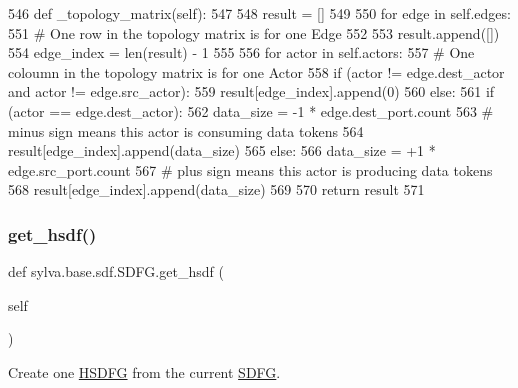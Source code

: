 \begin{DoxyCode}
546     \textcolor{keyword}{def }\_topology\_matrix(self):
547 
548         result = []
549 
550         \textcolor{keywordflow}{for} edge \textcolor{keywordflow}{in} self.edges:
551             \textcolor{comment}{# One row in the topology matrix is for one Edge}
552 
553             result.append([])
554             edge\_index = len(result) - 1
555 
556             \textcolor{keywordflow}{for} actor \textcolor{keywordflow}{in} self.actors:
557                 \textcolor{comment}{# One coloumn in the topology matrix is for one Actor}
558                 \textcolor{keywordflow}{if} (actor != edge.dest\_actor \textcolor{keywordflow}{and} actor != edge.src\_actor):
559                     result[edge\_index].append(0)
560                 \textcolor{keywordflow}{else}:
561                     \textcolor{keywordflow}{if} (actor == edge.dest\_actor):
562                         data\_size = -1 * edge.dest\_port.count
563                         \textcolor{comment}{# minus sign means this actor is consuming data tokens}
564                         result[edge\_index].append(data\_size)
565                     \textcolor{keywordflow}{else}:
566                         data\_size = +1 * edge.src\_port.count
567                         \textcolor{comment}{# plus sign means this actor is producing data tokens}
568                         result[edge\_index].append(data\_size)
569 
570         \textcolor{keywordflow}{return} result
571 
\end{DoxyCode}
\mbox{\label{classsylva_1_1base_1_1sdf_1_1_s_d_f_g_a66a5aaee4dc1232667e724e318f17008}} 
\subsubsection{\texorpdfstring{get\+\_\+hsdf()}{get\_hsdf()}}
{\footnotesize\ttfamily def sylva.\+base.\+sdf.\+S\+D\+F\+G.\+get\+\_\+hsdf (\begin{DoxyParamCaption}\item[{}]{self }\end{DoxyParamCaption})}



Create one \hyperlink{classsylva_1_1base_1_1sdf_1_1_h_s_d_f_g}{H\+S\+D\+FG} from the current \hyperlink{classsylva_1_1base_1_1sdf_1_1_s_d_f_g}{S\+D\+FG}. 


